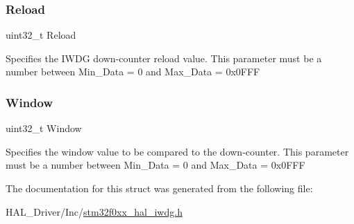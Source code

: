 \subsubsection{\texorpdfstring{Reload}{Reload}}
{\footnotesize\ttfamily uint32\+\_\+t Reload}

Specifies the I\+W\+DG down-\/counter reload value. This parameter must be a number between Min\+\_\+\+Data = 0 and Max\+\_\+\+Data = 0x0\+F\+FF \mbox{\label{struct_i_w_d_g___init_type_def_a0ea3a5767370dd42e6108643f23d5c68}} 
\subsubsection{\texorpdfstring{Window}{Window}}
{\footnotesize\ttfamily uint32\+\_\+t Window}

Specifies the window value to be compared to the down-\/counter. This parameter must be a number between Min\+\_\+\+Data = 0 and Max\+\_\+\+Data = 0x0\+F\+FF 

The documentation for this struct was generated from the following file\+:\begin{DoxyCompactItemize}
\item 
H\+A\+L\+\_\+\+Driver/\+Inc/\hyperlink{stm32f0xx__hal__iwdg_8h}{stm32f0xx\+\_\+hal\+\_\+iwdg.\+h}\end{DoxyCompactItemize}
